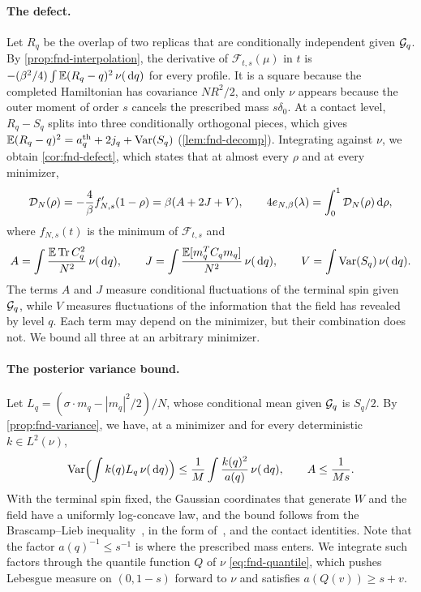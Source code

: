 \paragraph{The defect.}
Let $R_q$ be the overlap of two replicas that are conditionally
independent given $\mathcal G_q$. By \cref{prop:fnd-interpolation}, the
derivative of $\mathcal F_{t,s}(\mu)$ in $t$ is
$-(\beta^2/4)\int\mathbb E(R_q-q)^2\,\nu(\,\mathrm d q)$ for every profile. It is a
square because the completed Hamiltonian has covariance $NR^2/2$, and
only $\nu$ appears because the outer moment of order $s$ cancels the
prescribed mass $s\delta_0$. At a contact level,
$R_q-S_q$ splits into three conditionally orthogonal pieces, which
gives $\mathbb E(R_q-q)^2=a^{\rm th}_q+2j_q+\operatorname{Var}(S_q)$ (\cref{lem:fnd-decomp}).
Integrating against $\nu$, we obtain \cref{cor:fnd-defect}, which
states that at almost every $\rho$ and at every minimizer,
\[
 \mathcal D_N(\rho)=-\frac4\beta f_{N,s}'(1-\rho)=\beta(A+2J+V),
 \qquad 4e_{N,\beta}(\lambda)=\int_0^1\mathcal D_N(\rho)\,\mathrm d\rho,
\]
where $f_{N,s}(t)$ is the minimum of $\mathcal F_{t,s}$ and
\[
 A=\int\frac{\mathbb E\operatorname{Tr} C_q^2}{N^2}\,\nu(\,\mathrm d q),\qquad
 J=\int\frac{\mathbb E[m_q^TC_qm_q]}{N^2}\,\nu(\,\mathrm d q),\qquad
 V=\int\operatorname{Var}(S_q)\,\nu(\,\mathrm d q).
\]
The terms $A$ and $J$ measure conditional fluctuations of the terminal
spin given $\mathcal G_q$, while $V$ measures fluctuations of the information
that the field has revealed by level $q$. Each term may depend on the
minimizer, but their combination does not. We bound all three at an
arbitrary minimizer.

\paragraph{The posterior variance bound.}
Let $L_q=(\sigma\cdot m_q-|m_q|^2/2)/N$, whose conditional mean given
$\mathcal G_q$ is $S_q/2$. By \cref{prop:fnd-variance}, we have, at a
minimizer and for every deterministic $k\in L^2(\nu)$,
\[
 \operatorname{Var}\Bigl(\int k(q)L_q\,\nu(\,\mathrm d q)\Bigr)
 \le\frac1M\int\frac{k(q)^2}{a(q)}\,\nu(\,\mathrm d q),
 \qquad A\le\frac1{Ms}.
\]
With the terminal spin fixed, the Gaussian coordinates that generate
$W$ and the field have a uniformly log-concave law, and the bound
follows from the Brascamp--Lieb inequality~\cite{BrascampLieb1976}, in
the form of~\cite[Proposition~2.2]{AL}, and the contact identities.
Note that the factor $a(q)^{-1}\le s^{-1}$ is where the prescribed mass
enters. We integrate such factors through the quantile function $Q$ of
$\nu$ \eqref{eq:fnd-quantile}, which pushes Lebesgue measure on
$(0,1-s)$ forward to $\nu$ and satisfies $a(Q(v))\ge s+v$.

